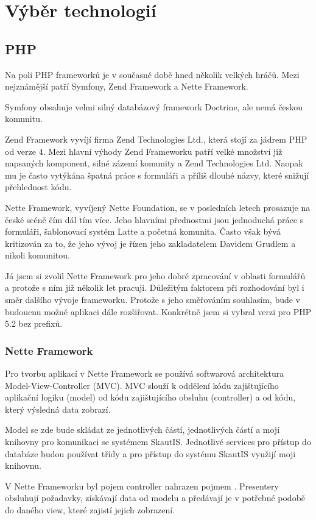 \documentclass[thesis=B,czech]{FITthesis}[2011/06/14]
\begin{document}
\section{Výběr technologií}
\subsection{PHP}
Na poli PHP frameworků je v současné době hned několik velkých hráčů. Mezi nejznámější patří Symfony, Zend Framework a Nette Framework.

Symfony obsahuje velmi silný databázový framework Doctrine, ale nemá českou komunitu.

Zend Framework vyvíjí firma Zend Technologies Ltd., která stojí za jádrem PHP od verze 4. Mezi hlavní výhody Zend Frameworku patří velké množství již napsaných komponent, silné zázemí komunity a Zend Technologies Ltd. Naopak mu je často vytýkána špatná práce s formuláři a příliš dlouhé názvy, které snižují přehlednost kódu. 

Nette Framework, vyvíjený Nette Foundation, se v posledních letech prosazuje na české scéně čím dál tím více. Jeho hlavními přednostmi jsou jednoduchá práce s formuláři, šablonovací systém Latte a početná komunita. Často však bývá kritizován za to, že jeho vývoj je řízen jeho zakladatelem Davidem Grudlem a nikoli komunitou.

Já jsem si zvolil Nette Framework pro jeho dobré zpracování v oblasti formulářů a protože s ním již několik let pracuji. Důležitým faktorem při rozhodování byl i směr dalšího vývoje frameworku. Protože s jeho směřováním souhlasím, bude v budoucnu možné aplikaci dále rozšiřovat. Konkrétně jsem si vybral verzi pro PHP 5.2 bez prefixů.

\subsubsection*{Nette Framework}
Pro tvorbu aplikací v Nette Framework se používá softwarová architektura Model-View-Controller (MVC). MVC slouží k oddělení kódu zajištujícího aplikační logiku (model) od kódu zajištujícího obsluhu (controller) a od kódu, který výsledná data zobrazí.

Model se zde bude skládat ze  jednotlivých částí,  jednotlivých částí a mojí knihovny pro komunikaci se systémem SkautIS. Jednotlivé services pro přístup do databáze budou používat třídy  a pro přístup do systému SkautIS využijí moji knihovnu.

V Nette Frameworku byl pojem controller nahrazen pojmem . Presentery obsluhují požadavky, získávají data od modelu a předávají je v potřebné podobě do daného view, které zajistí jejich zobrazení.
\end{document}
